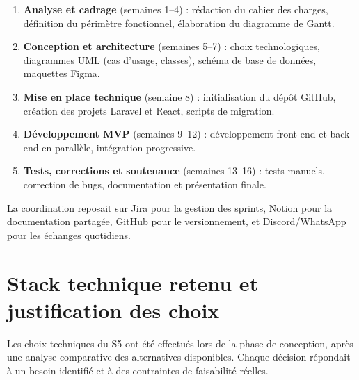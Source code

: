 \documentclass[11pt,a4paper]{report}
\begin{document}
\begin{enumerate}
    \item \textbf{Analyse et cadrage} (semaines 1--4) : rédaction du cahier des charges, définition du périmètre fonctionnel, élaboration du diagramme de Gantt.
    \item \textbf{Conception et architecture} (semaines 5--7) : choix technologiques, diagrammes UML (cas d'usage, classes), schéma de base de données, maquettes Figma.
    \item \textbf{Mise en place technique} (semaine 8) : initialisation du dépôt GitHub, création des projets Laravel et React, scripts de migration.
    \item \textbf{Développement MVP} (semaines 9--12) : développement front-end et back-end en parallèle, intégration progressive.
    \item \textbf{Tests, corrections et soutenance} (semaines 13--16) : tests manuels, correction de bugs, documentation et présentation finale.
\end{enumerate}

La coordination reposait sur Jira pour la gestion des sprints, Notion pour la documentation partagée, GitHub pour le versionnement, et Discord/WhatsApp pour les échanges quotidiens.

\section{Stack technique retenu et justification des choix}

Les choix techniques du S5 ont été effectués lors de la phase de conception, après une analyse comparative des alternatives disponibles. Chaque décision répondait à un besoin identifié et à des contraintes de faisabilité réelles.
\end{document}
